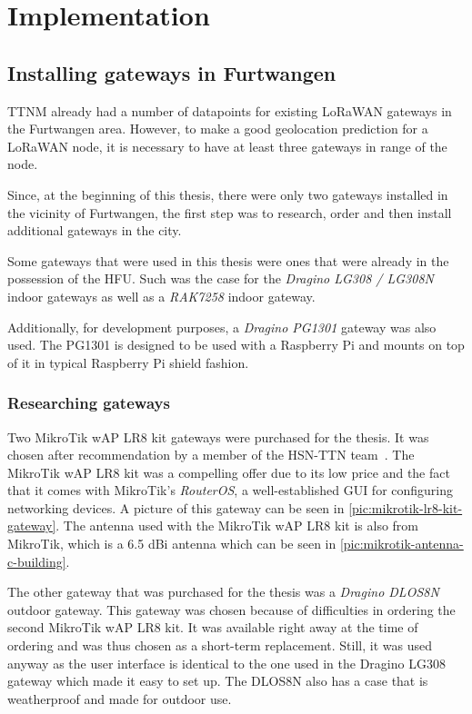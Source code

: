 \chapter{Implementation}

\section{Installing gateways in Furtwangen}

\ac{TTNM} already had a number of datapoints for existing \ac{LoRaWAN} gateways in the Furtwangen area.
However, to make a good geolocation prediction for a \ac{LoRaWAN} node, it is necessary to have at least three gateways in range of the node.

Since, at the beginning of this thesis, there were only two gateways installed in the vicinity of Furtwangen, the first step was to research, order and then install additional gateways in the city.

Some gateways that were used in this thesis were ones that were already in the possession of the \ac{HFU}.
Such was the case for the \emph{Dragino LG308 / LG308N} indoor gateways as well as a \emph{RAK7258} indoor gateway.

Additionally, for development purposes, a \emph{Dragino PG1301} gateway was also used.
The PG1301 is designed to be used with a Raspberry Pi and mounts on top of it in typical Raspberry Pi shield fashion.

\subsection{Researching gateways}

Two MikroTik wAP LR8 kit gateways were purchased for the thesis.
It was chosen after recommendation by a member of the \ac{HSN-TTN} team~\cite{hochschwarzwald_smart_net_-_thethingsnetwork_eingesetzte_nodate}.
The MikroTik wAP LR8 kit was a compelling offer due to its low price and the fact that it comes with MikroTik's \emph{RouterOS}, a well-established GUI for configuring networking devices.
A picture of this gateway can be seen in \cref{pic:mikrotik-lr8-kit-gateway}.
The antenna used with the MikroTik wAP LR8 kit is also from MikroTik, which is a 6.5 dBi antenna which can be seen in \cref{pic:mikrotik-antenna-c-building}.

The other gateway that was purchased for the thesis was a \emph{Dragino DLOS8N} outdoor gateway.
This gateway was chosen because of difficulties in ordering the second MikroTik wAP LR8 kit.
It was available right away at the time of ordering and was thus chosen as a short-term replacement.
Still, it was used anyway as the user interface is identical to the one used in the Dragino LG308 gateway which made it easy to set up.
The DLOS8N also has a case that is weatherproof and made for outdoor use.

